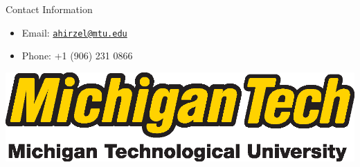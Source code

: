 \documentclass[final]{beamer}
\newlength{\onecolwid}
\begin{document}
\begin{frame}[t]
\begin{columns}[t]
\begin{column}{\onecolwid}
\begin{block}{Contact Information}
\begin{itemize}
\item Email: \href{mailto:ahirzel@mtu.edu}{\texttt{ahirzel@mtu.edu}}
\item Phone: +1 (906) 231 0866
\end{itemize}

\end{block}

\begin{center}
\includegraphics[width=0.4\linewidth]{logo_withfullname_LG.eps}
\end{center}


\end{column} %

\end{columns} %

\end{frame} %
\end{document}
